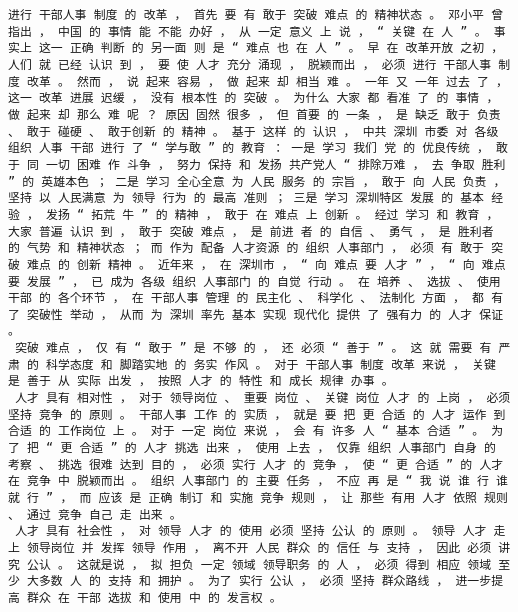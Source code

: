 \documentclass{article}
\begin{document}
\begin{Verbatim}[commandchars=\\\{\}]
 进行 干部人事 制度 的 改革 ， 首先 要 有 敢于 突破 难点 的 精神状态 。 邓小平 曾 指出 ， 中国 的 事情 能 不能 办好 ， 从 一定 意义 上 说 ， “ 关键 在 人 ” 。 事实上 这一 正确 判断 的 另一面 则 是 “ 难点 也 在 人 ” 。 早 在 改革开放 之初 ， 人们 就 已经 认识 到 ， 要 使 人才 充分 涌现 ， 脱颖而出 ， 必须 进行 干部人事 制度 改革 。 然而 ， 说 起来 容易 ， 做 起来 却 相当 难 。 一年 又 一年 过去 了 ， 这一 改革 进展 迟缓 ， 没有 根本性 的 突破 。 为什么 大家 都 看准 了 的 事情 ， 做 起来 却 那么 难 呢 ？ 原因 固然 很多 ， 但 首要 的 一条 ， 是 缺乏 敢于 负责 、 敢于 碰硬 、 敢于创新 的 精神 。 基于 这样 的 认识 ， 中共 深圳 市委 对 各级 组织 人事 干部 进行 了 “ 学与敢 ” 的 教育 ： 一是 学习 我们 党 的 优良传统 ， 敢于 同 一切 困难 作 斗争 ， 努力 保持 和 发扬 共产党人 “ 排除万难 ， 去 争取 胜利 ” 的 英雄本色 ； 二是 学习 全心全意 为 人民 服务 的 宗旨 ， 敢于 向 人民 负责 ， 坚持 以 人民满意 为 领导 行为 的 最高 准则 ； 三是 学习 深圳特区 发展 的 基本 经验 ， 发扬 “ 拓荒 牛 ” 的 精神 ， 敢于 在 难点 上 创新 。 经过 学习 和 教育 ， 大家 普遍 认识 到 ， 敢于 突破 难点 ， 是 前进 者 的 自信 、 勇气 ， 是 胜利者 的 气势 和 精神状态 ； 而 作为 配备 人才资源 的 组织 人事部门 ， 必须 有 敢于 突破 难点 的 创新 精神 。 近年来 ， 在 深圳市 ， “ 向 难点 要 人才 ” ， “ 向 难点 要 发展 ” ， 已 成为 各级 组织 人事部门 的 自觉 行动 。 在 培养 、 选拔 、 使用 干部 的 各个环节 ， 在 干部人事 管理 的 民主化 、 科学化 、 法制化 方面 ， 都 有 了 突破性 举动 ， 从而 为 深圳 率先 基本 实现 现代化 提供 了 强有力 的 人才 保证 。 
 突破 难点 ， 仅 有 “ 敢于 ” 是 不够 的 ， 还 必须 “ 善于 ” 。 这 就 需要 有 严肃 的 科学态度 和 脚踏实地 的 务实 作风 。 对于 干部人事 制度 改革 来说 ， 关键 是 善于 从 实际 出发 ， 按照 人才 的 特性 和 成长 规律 办事 。 
 人才 具有 相对性 ， 对于 领导岗位 、 重要 岗位 、 关键 岗位 人才 的 上岗 ， 必须 坚持 竞争 的 原则 。 干部人事 工作 的 实质 ， 就是 要 把 更 合适 的 人才 运作 到 合适 的 工作岗位 上 。 对于 一定 岗位 来说 ， 会 有 许多 人 “ 基本 合适 ” 。 为了 把 “ 更 合适 ” 的 人才 挑选 出来 ， 使用 上去 ， 仅靠 组织 人事部门 自身 的 考察 、 挑选 很难 达到 目的 ， 必须 实行 人才 的 竞争 ， 使 “ 更 合适 ” 的 人才 在 竞争 中 脱颖而出 。 组织 人事部门 的 主要 任务 ， 不应 再 是 “ 我 说 谁 行 谁 就 行 ” ， 而 应该 是 正确 制订 和 实施 竞争 规则 ， 让 那些 有用 人才 依照 规则 、 通过 竞争 自己 走 出来 。 
 人才 具有 社会性 ， 对 领导 人才 的 使用 必须 坚持 公认 的 原则 。 领导 人才 走上 领导岗位 并 发挥 领导 作用 ， 离不开 人民 群众 的 信任 与 支持 ， 因此 必须 讲究 公认 。 这就是说 ， 拟 担负 一定 领域 领导职务 的 人 ， 必须 得到 相应 领域 至少 大多数 人 的 支持 和 拥护 。 为了 实行 公认 ， 必须 坚持 群众路线 ， 进一步提高 群众 在 干部 选拔 和 使用 中 的 发言权 。 

\end{Verbatim}
\end{document}
